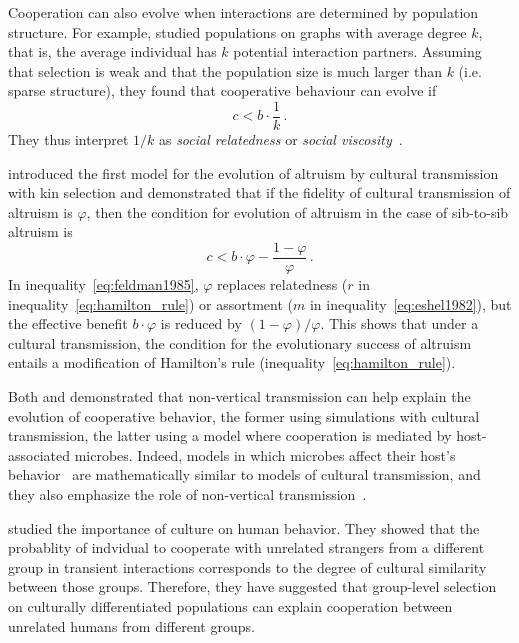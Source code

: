 \documentclass[12pt]{extarticle}
\begin{document}
Cooperation can also evolve when interactions are determined by population structure. For example, \citet{Ohtsuki2006} studied populations on graphs with average degree $k$, that is, the average individual has $k$ potential interaction partners. Assuming that selection is weak and that the population size is much larger than $k$ (i.e. sparse structure), they found that cooperative behaviour can evolve if~\citep{Ohtsuki2006}
\begin{equation} \label{eq:ohtsuki2006}
c < b \cdot \frac{1}{k} \,.
\end{equation}
They thus interpret $1/k$ as \emph{social relatedness} or \emph{social viscosity}~\citep{Ohtsuki2006}.


\citet{feldman1985gene} introduced the first model for the evolution of altruism by cultural transmission with kin selection and demonstrated that if the fidelity of cultural transmission of altruism is $\varphi$, then the condition for evolution of altruism in the case of sib-to-sib altruism is \citep[Eq.~16]{feldman1985gene}
\begin{equation} \label{eq:feldman1985}
c < b \cdot \varphi - \frac{1-\varphi}{\varphi} \,.
\end{equation}
In inequality~\ref{eq:feldman1985}, $\varphi$ replaces relatedness ($r$ in inequality~\ref{eq:hamilton_rule}) or assortment ($m$ in inequality~\ref{eq:eshel1982}), but the effective benefit $b\cdot \varphi$ is  reduced by $(1-\varphi)/\varphi$.
This shows that under a cultural transmission, the condition for the evolutionary success of altruism entails a modification of Hamilton's rule (inequality~\ref{eq:hamilton_rule}).

Both \citet{woodcock2006significance} and \citet{lewin2017microbes} demonstrated that non-vertical transmission can help explain the evolution of cooperative behavior, the former using simulations with cultural transmission, the latter using a model where cooperation is mediated by host-associated microbes.
Indeed, models in which microbes affect their host's behavior~\citep{lewin2017microbes,lewin2020rockpaperscissors,gurevich2020parental} are mathematically similar to models of cultural transmission, and they also emphasize the role of non-vertical transmission~\citep{cavalli1981cultural}.

\citet{handley2020human} studied the importance of culture on human behavior. They showed that the probablity of indvidual to cooperate with unrelated strangers from a different group in transient interactions corresponds to the degree of cultural similarity between those groups.
Therefore, they have suggested that group-level selection on culturally differentiated populations can explain cooperation between unrelated humans from different groups.
\end{document}
